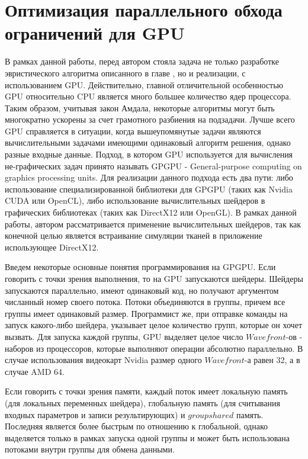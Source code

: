 \section{Оптимизация параллельного обхода ограничений для GPU} \label{ch3:chunks}
	В рамках данной работы, перед автором стояла задача не только разработке эвристического алгоритма описанного в главе \label{ch3:heuristic}, но и реализации, с использованием GPU. Действительно, главной отличительной особенностью GPU относительно CPU является много большее количество ядер процессора. Таким образом, учитывая закон Амдала, некоторые алгоритмы могут быть многократно ускорены за счет грамотного разбиения на подзадачи. Лучше всего GPU справляется в ситуации, когда вышеупомянутые задачи являются вычислительными задачами имеющими одинаковый алгоритм решения, однако разные входные данные. Подход, в котором GPU используется для вычисления не-графических задач принято называть GPGPU - General-purpose computing on graphics processing units. Для реализации данного подхода есть два пути: либо использование специализированной библиотеки для GPGPU (таких как Nvidia CUDA или OpenCL), либо использование вычислительных шейдеров в графических библиотеках (таких как DirectX12 или OpenGL). В рамках данной работы, автором рассматривается применение вычислительных шейдеров, так как конечной целью является встраивание симуляции тканей в приложение использующее DirectX12.
	
	Введем некоторые основные понятия программирования на GPGPU. Если говорить с точки зрения выполнения, то на GPU запускаются шейдеры. Шейдеры запускаются параллельно, имеют одинаковый код, но получают аргументом числанный номер своего потока. Потоки объединяются в группы, причем все группы имеет одинаковый размер. Программист же, при отправке команды на запуск какого-либо шейдера, указывает целое количество групп, которые он хочет вызвать. Для запуска каждой группы, GPU выделяет целое число $Wavefront$-ов - наборов из процессоров, которые выполняют операции абсолютно параллельно. В случае использования видеокарт Nvidia размер одного $Wavefront$-а равен 32, а в случае AMD 64.
	
	Если говорить с точки зрения памяти, каждый поток имеет локальную память (для локальных переменных шейдера), глобальную память (для считывания входных параметров и записи результирующих) и $groupshared$ память. Последняя является более быстрым по отношению к глобальной, однако выделяется только в рамках запуска одной группы и может быть использована потоками внутри группы для обмена данными.
	
